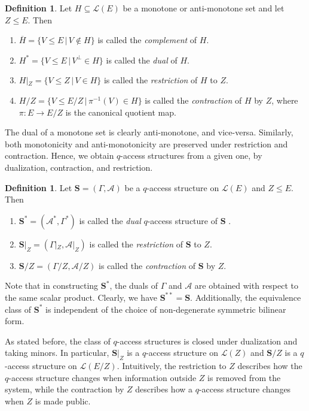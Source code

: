 \documentclass[onecolumn,draftclsnofoot,12pt]{IEEEtran}
\theoremstyle{plain} %
\theoremstyle{definition}
\newtheorem{definition}[theorem]{Definition}
\begin{document}
\begin{definition} Let $H\subseteq \mathcal{L}(E)$ be a monotone or anti-monotone set and let $Z\leq E$. Then 
\begin{enumerate}
    \item $\overline{H} = \{V \leq E\,|\, V\notin H\}$ is called the \textit{complement} of $H$.
    \item $H^*=\{ V\leq E\,|\, V^{\perp}\in H \}$ is called the \textit{dual} of $H$.
    \item $H|_Z = \{ V \leq Z\,|\, V\in H\}$ is called the \textit{restriction} of $H$ to $Z$.
    \item $H/Z = \{V \leq E/Z \,|\, \pi^{-1}(V)\in H\}$ is called the \textit{contraction} of $H$ by $Z$, where $\pi\colon E\rightarrow E/Z$ is the canonical quotient map.
\end{enumerate}
\end{definition}
The dual of a monotone set is clearly anti-monotone, and vice-versa. Similarly, both monotonicity and anti-monotonicity are preserved under restriction and contraction. Hence, we obtain $q$-access structures from a given one, by dualization, contraction, and restriction.

\begin{definition} Let $\mathbf{S}=(\Gamma,\mathcal{A})$ be a $q$-access structure on $\mathcal{L}(E)$ and $Z\leq E$. Then
\begin{enumerate}
    \item $\mathbf{S}^* = (\mathcal{A}^*,\Gamma^*)$ is called the \textit{dual} $q$-access structure of $\mathbf{S}$ .
    \item $\mathbf{S} |_Z = (\Gamma|_Z,\mathcal{A}|_Z)$ is called the \textit{restriction} of $\mathbf{S}$ to $Z$.
    \item $\mathbf{S}/Z = (\Gamma/Z,\mathcal{A}/Z)$ is called the \textit{contraction} of $\mathbf{S}$ by $Z$.
\end{enumerate}
\end{definition}



Note that in constructing $\mathbf{S}^*$, the duals of $\Gamma$ and $\mathcal{A}$ are obtained with respect to the same scalar product. Clearly, we have $\mathbf{S}^{**}=\mathbf{S}$. Additionally, the equivalence class of $\mathbf{S}^*$ is independent of the choice of non-degenerate symmetric bilinear form.

 As stated before, the class of $q$-access structures is closed under dualization and taking minors. In particular, $\mathbf{S}|_Z$ is a $q$-access structure on $\mathcal{L}(Z)$ and $\mathbf{S}/Z$ is a $q$-access structure on $\mathcal{L}(E/Z)$. Intuitively, the restriction to $Z$ describes how the $q$-access structure changes when information outside $Z$ is removed from the system, while the contraction by $Z$ describes how a $q$-access structure changes when $Z$ is made public.
\end{document}
